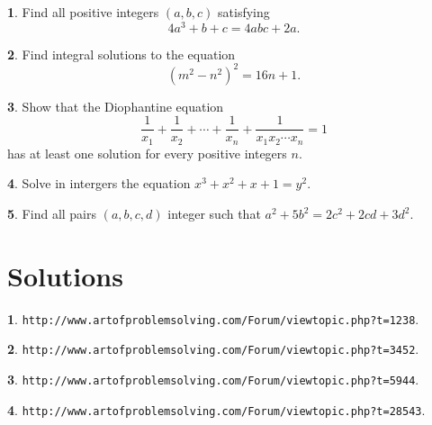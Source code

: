 \documentclass{article}
\theoremstyle{definition}
\newtheorem{p}{}
\newtheorem{s}{}
\begin{document}
	
	
	
	\begin{p}
		Find all positive integers $ (a,b,c)$ satisfying
		\[ 4a^{3}+b+c=4abc+2a.\]
	\end{p}
	
	
	
	
	
	
	\begin{p}
		Find integral solutions to the equation \[(m^{2}-n^{2})^{2}=16n+1.\]
	\end{p}
	
	
	
	
	
	
	\begin{p}
		Show that the Diophantine equation \[\frac{1}{x_{1}}+\frac{1}{x_{2}}+\cdots+\frac{1}{x_{n}}+\frac{1}{x_{1}x_{2}\cdots x_{n}}= 1\] has at least one solution for every positive integers $n$.
	\end{p}
	
	
	
	
	
	
	\begin{p}
		Solve in intergers the equation $x^{3}+x^{2}+x+1=y^{2}$.
	\end{p}
	
	
	
	
	
	
	\begin{p}
		Find all pairs $ (a,b,c,d)$ integer such that $ a^2+5b^2=2c^2+2cd+3d^2$.
	\end{p}
	
	
	
	
	\newpage
	\section{Solutions}
	
	\begin{s}
		\texttt{http://www.artofproblemsolving.com/Forum/viewtopic.php?t=1238}.
	\end{s}
	
	\begin{s}
		\texttt{http://www.artofproblemsolving.com/Forum/viewtopic.php?t=3452}.
	\end{s}
	
	
	\begin{s}
		\texttt{http://www.artofproblemsolving.com/Forum/viewtopic.php?t=5944}.
	\end{s}
	
	
	
	
	\begin{s}
		\texttt{http://www.artofproblemsolving.com/Forum/viewtopic.php?t=28543}.
	\end{s}
	
\end{document}
